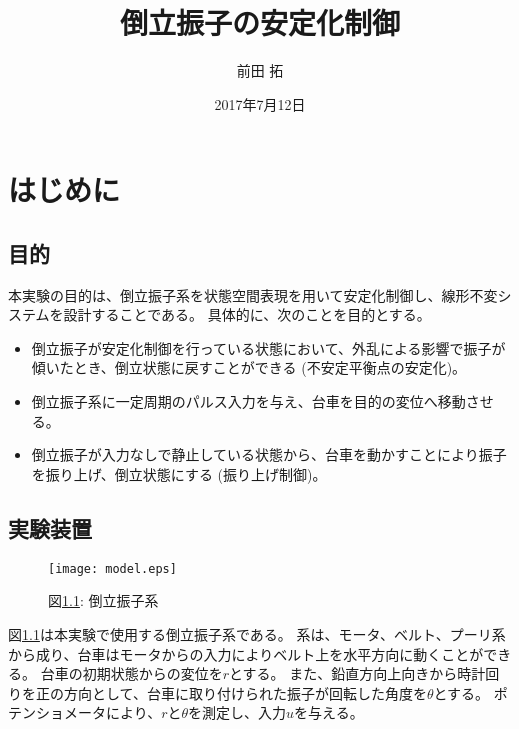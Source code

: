 \documentclass[a4j,11pt,twoside]{jbook}
\begin{document}
\title{倒立振子の安定化制御}
\author{前田 拓}
\date{2017年7月12日}
\maketitle

\tableofcontents
\listoffigures
\listoftables
{}


\chapter{はじめに}
\section{目的}
本実験の目的は、倒立振子系を状態空間表現を用いて安定化制御し、線形不変システムを設計することである。
具体的に、次のことを目的とする。

\begin{itemize}
    \item 倒立振子が安定化制御を行っている状態において、外乱による影響で振子が傾いたとき、倒立状態に戻すことができる (不安定平衡点の安定化)。
    \item 倒立振子系に一定周期のパルス入力を与え、台車を目的の変位へ移動させる。
    \item 倒立振子が入力なしで静止している状態から、台車を動かすことにより振子を振り上げ、倒立状態にする (振り上げ制御)。
\end{itemize}

\section{実験装置}

\begin{figure}[htbp]
    \begin{center}
        \texttt{[image: model.eps]}
        \caption{図\ref{pendulum}: 倒立振子系}
        \label{pendulum}
    \end{center}
\end{figure}

図\ref{pendulum}は本実験で使用する倒立振子系である。
系は、モータ、ベルト、プーリ系から成り、台車はモータからの入力によりベルト上を水平方向に動くことができる。
台車の初期状態からの変位を$r$とする。
また、鉛直方向上向きから時計回りを正の方向として、台車に取り付けられた振子が回転した角度を$\theta$とする。
ポテンショメータにより、$r$と$\theta$を測定し、入力$u$を与える。
\end{document}
